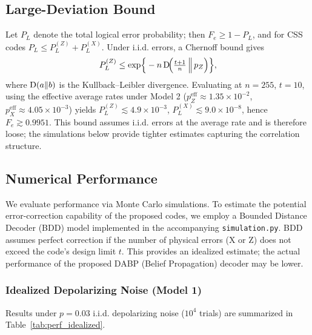 \subsection{Large-Deviation Bound}\label{sec:fidelity_bound}
Let \(P_L\) denote the total logical error probability; then \(F_e \ge 1-P_L\), and for CSS codes \(P_L \le P_L^{(Z)}+P_L^{(X)}\). Under i.i.d. errors, a Chernoff bound gives
\begin{equation}
P_L^{(Z)} \le \exp\!\Big\{-n\, \mathrm{D}\!\Big(\tfrac{t+1}{n}\,\Big\Vert\, p_Z\Big)\Big\},\label{eq:ldp}
\end{equation}
where \(\mathrm{D}(a\Vert b)\) is the Kullback--Leibler divergence.
Evaluating at \(n=255\), \(t=10\), using the effective average rates under Model 2 (\(p_Z^{\mathrm{eff}}\approx1.35\times10^{-2}\), \(p_X^{\mathrm{eff}}\approx4.05\times10^{-3}\)) yields
\(P_L^{(Z)} \lesssim 4.9\times10^{-3}\), \(P_L^{(X)} \lesssim 9.0\times10^{-8}\), hence \(F_e \gtrsim 0.9951\).
This bound assumes i.i.d. errors at the average rate and is therefore loose; the simulations below provide tighter estimates capturing the correlation structure.

\subsection{Numerical Performance}\label{sec:comparison}

We evaluate performance via Monte Carlo simulations. To estimate the potential error-correction capability of the proposed codes, we employ a Bounded Distance Decoder (BDD) model implemented in the accompanying \texttt{simulation.py}. BDD assumes perfect correction if the number of physical errors (X or Z) does not exceed the code's design limit \(t\). This provides an idealized estimate; the actual performance of the proposed DABP (Belief Propagation) decoder may be lower.

\subsubsection{Idealized Depolarizing Noise (Model 1)}
Results under \(p=0.03\) i.i.d. depolarizing noise (\(10^4\) trials) are summarized in Table~\ref{tab:perf_idealized}.

